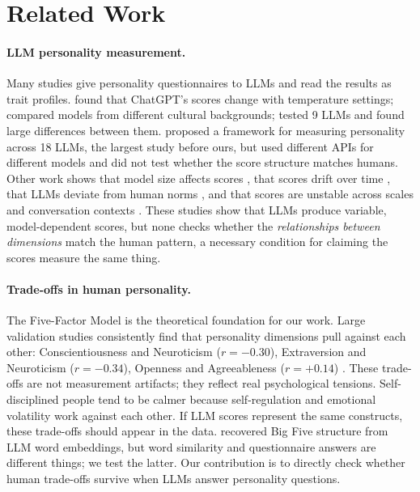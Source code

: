\documentclass[11pt]{article}
\begin{document}
\FloatBarrier

\section{Related Work}
\label{sec:related}

\paragraph{LLM personality measurement.}
Many studies give personality questionnaires to LLMs and read the results as trait profiles.
\citet{jiang2023personality} found that ChatGPT's scores change with temperature settings; \citet{pan2024personality} compared models from different cultural backgrounds; \citet{schaekermann2024personality} tested 9 LLMs and found large differences between them.
\citet{serapio-garcia2025personality} proposed a framework for measuring personality across 18 LLMs, the largest study before ours, but used different APIs for different models and did not test whether the score structure matches humans.
Other work shows that model size affects scores \citep{hilliard2024eliciting}, that scores drift over time \citep{bodroza2024personality}, that LLMs deviate from human norms \citep{sorokovikova2024big}, and that scores are unstable across scales and conversation contexts \citep{tosato2025instability}.
These studies show that LLMs produce variable, model-dependent scores, but none checks whether the \emph{relationships between dimensions} match the human pattern, a necessary condition for claiming the scores measure the same thing.

\paragraph{Trade-offs in human personality.}
The Five-Factor Model \citep{mccrae1992five} is the theoretical foundation for our work.
Large validation studies consistently find that personality dimensions pull against each other: Conscientiousness and Neuroticism ($r = -0.30$), Extraversion and Neuroticism ($r = -0.34$), Openness and Agreeableness ($r = +0.14$) \citep{soto2017bfi2}.
These trade-offs are not measurement artifacts; they reflect real psychological tensions. Self-disciplined people tend to be calmer because self-regulation and emotional volatility work against each other.
If LLM scores represent the same constructs, these trade-offs should appear in the data.
\citet{suh2024rediscovering} recovered Big Five structure from LLM word embeddings, but word similarity and questionnaire answers are different things; we test the latter.
Our contribution is to directly check whether human trade-offs survive when LLMs answer personality questions.
\end{document}
